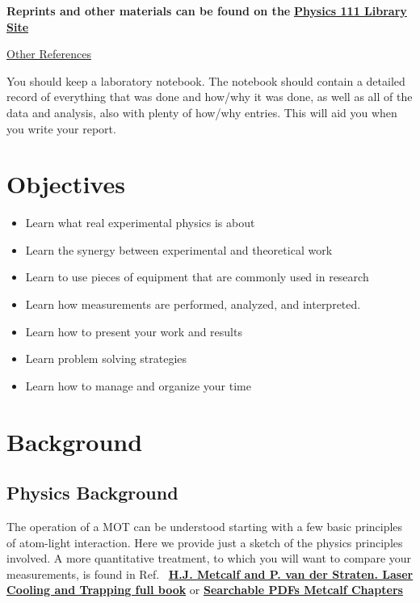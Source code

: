 \documentclass{../lab}
\begin{document}
\textbf{Reprints and other materials can be found on the} \href{http://physics111.lib.berkeley.edu/Physics111/Reprints/MOT/MOT\_index.html}{\textbf{Physics 111 Library Site}}

\hyperref[sec:References]{Other References}

You should keep a laboratory notebook. The notebook should contain a detailed record of everything that was done and how/why it was done, as well as all of the data and analysis, also with plenty of how/why entries. This will aid you when you write your report.

\section{Objectives}

\begin{itemize}
    \item Learn what real experimental physics is about

    \item Learn the synergy between experimental and theoretical work

    \item Learn to use pieces of equipment that are commonly used in research

    \item Learn how measurements are performed, analyzed, and interpreted.

    \item Learn how to present your work and results

    \item Learn problem solving strategies

    \item Learn how to manage and organize your time
\end{itemize}

\section{Background}

\subsection{Physics Background}

The operation of a MOT can be understood starting with a few basic principles of atom-light interaction. Here we provide just a sketch of the physics principles involved. A more quantitative treatment, to which you will want to compare your measurements, is found in Ref.~\cite{Metcalf} \href{http://books.google.com/books?id=hDJPnSFh-g0C&dq=H.J.+Metcalf+and+P.+van+der+Straeten.+Laser+Cooling+and+Trapping+book&printsec=frontcover&source=bn&hl=en&ei=jMWaS4eRD4TuswPgytidAg&sa=X&oi=book\_result&ct=result&resnum=4&ved=0CBAQ6AEwAw#v=onepage&q=&f=false}{\textbf{H.J. Metcalf and P. van der Straten. Laser Cooling and Trapping full book}} or \href{http://physics111.lib.berkeley.edu/Physics111/Reprints/MOT/Laser\_Cooling\_and\_Trapping\_HJ\_Metcalf/}{\textbf{Searchable PDFs Metcalf Chapters}}
\end{document}
